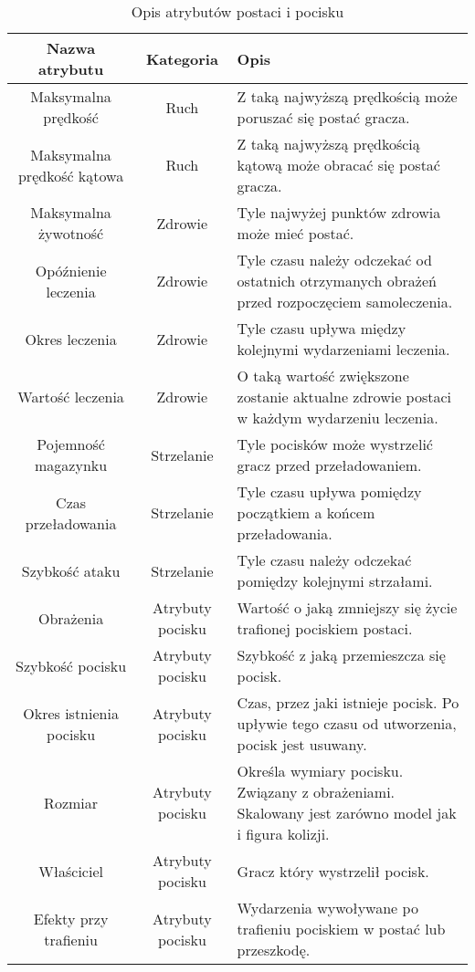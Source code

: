 \begin{table}
    \small
    \centering
    \caption{Opis atrybutów postaci i pocisku}
    \label{tab:stats_description}
    \begin{tabularx}{\linewidth}{|c|c|X|}
        \hline
        Nazwa atrybutu & Kategoria & Opis\\
        \hline \hline
        Maksymalna prędkość & Ruch & Z taką najwyższą prędkością może poruszać się postać gracza.\\
        \hline
        Maksymalna prędkość kątowa & Ruch & Z taką najwyższą prędkością kątową może obracać się postać gracza.\\
        \hline
        Maksymalna żywotność & Zdrowie & Tyle najwyżej punktów zdrowia może mieć postać. \\
        \hline 
        Opóźnienie leczenia & Zdrowie & Tyle czasu należy odczekać od ostatnich otrzymanych obrażeń przed rozpoczęciem samoleczenia. \\
        \hline
        Okres leczenia & Zdrowie & Tyle czasu upływa między kolejnymi wydarzeniami leczenia. \\
        \hline
        Wartość leczenia & Zdrowie & O taką wartość zwiększone zostanie aktualne zdrowie postaci w każdym wydarzeniu leczenia.\\
        \hline
        Pojemność magazynku & Strzelanie & Tyle pocisków może wystrzelić gracz przed przeładowaniem.\\
        \hline
        Czas przeładowania & Strzelanie & Tyle czasu upływa pomiędzy początkiem a końcem przeładowania. \\
        \hline
        Szybkość ataku & Strzelanie & Tyle czasu należy odczekać pomiędzy kolejnymi strzałami. \\
        \hline
        Obrażenia & Atrybuty pocisku & Wartość o jaką zmniejszy się życie trafionej pociskiem postaci. \\
        \hline
        Szybkość pocisku & Atrybuty pocisku & Szybkość z jaką przemieszcza się pocisk. \\
        \hline
        Okres istnienia pocisku & Atrybuty pocisku & Czas, przez jaki istnieje pocisk. Po upływie tego czasu od utworzenia, pocisk jest usuwany.\\
        \hline
        Rozmiar & Atrybuty pocisku & Określa wymiary pocisku. Związany z obrażeniami. Skalowany jest zarówno model jak i figura kolizji. \\
        \hline
        Właściciel & Atrybuty pocisku & Gracz który wystrzelił pocisk.\\
        \hline
        Efekty przy trafieniu & Atrybuty pocisku & Wydarzenia wywoływane po trafieniu pociskiem w postać lub przeszkodę. \\
        \hline
    \end{tabularx}
\end{table}

